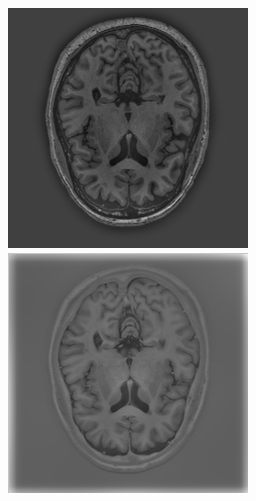 \documentclass[runningheads,a4paper]{llncs}
\begin{document}
\begin{figure}
   \begin{minipage}{.24\textwidth}
 \includegraphics[width=.99\linewidth]{./images/t1-gs.png}
 \end{minipage}
  \begin{minipage}{.24\textwidth}
 \includegraphics[width=.99\linewidth]{./images/t1-ir-gs.png}

\end{minipage}
\end{figure}
\end{document}
